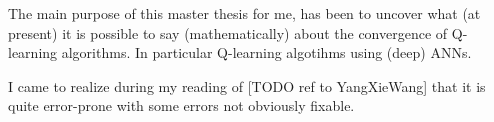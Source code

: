 
The main purpose of this master thesis for me,
has been to uncover what (at present) it is possible to say
(mathematically) about the convergence of Q-learning algorithms.
In particular Q-learning algotihms using (deep) ANNs.


I came to realize during my reading of
[TODO ref to YangXieWang]
that it is quite error-prone with some errors not obviously fixable.

